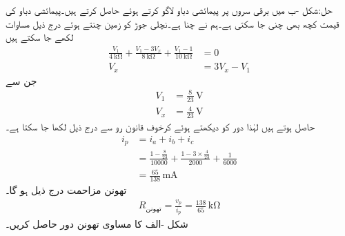 حل:شکل -ب میں برقی سروں  پر پیمائشی دباو لاگو کرتے ہوئے  حاصل کرتے ہیں۔پیمائشی دباو کی قیمت کچھ بھی چنی جا سکتی ہے۔ہم نے   چنا ہے۔نچلی جوڑ کو زمین چنتے ہوئے  درج ذیل مساوات لکھے جا سکتے ہیں
\begin{align*}
\frac{V_1}{\SI{4}{\kilo\ohm}}+\frac{V_1-3V_x}{\SI{8}{\kilo\ohm}}+\frac{V_1-1}{\SI{10}{\kilo\ohm}}&=0\\
V_x&=3V_x-V_1
\end{align*}
جن سے
\begin{align*}
V_1&=\frac{8}{23}\,\si{\volt}\\
V_x&=\frac{4}{23}\, \si{\volt}
\end{align*}
حاصل ہوتے ہیں لہٰذا دور کو دیکھتے ہوئے کرخوف قانون رو سے درج ذیل لکھا جا سکتا ہے۔
\begin{align*}
i_p&=i_a+i_b+i_c\\
&=\frac{1-\frac{8}{23}}{10000}+\frac{1-3\times \frac{4}{23}}{2000}+\frac{1}{6000}\\
&=\frac{65}{138}\, \si{\milli\ampere}
\end{align*}
تھونن مزاحمت درج ذیل ہو گا۔
\begin{align*}
R_{\text{تھونن}}=\frac{v_p}{i_p}=\frac{138}{65} \, \si{\kilo\ohm}
\end{align*}
شکل -الف کا مساوی تھونن دور حاصل کریں۔

